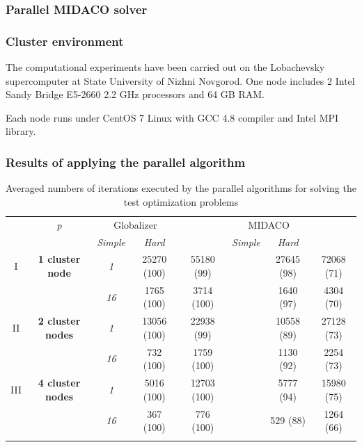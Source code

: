 \documentclass[aspectratio=1610]{beamer}
\begin{document}
\begin{frame}
  \frametitle{Parallel MIDACO solver}
\end{frame}

\begin{frame}
  \frametitle{Cluster environment}
  \begin{center}
  The computational experiments have been carried out on the Lobachevsky supercomputer at  State University of Nizhni Novgorod.
  One node includes 2 Intel Sandy Bridge E5-2660 2.2 GHz processors and 64 GB RAM.

  Each node runs under CentOS 7 Linux with GCC 4.8 compiler and Intel MPI library.
\end{center}
\end{frame}

\begin{frame}
  \frametitle{Results of applying the parallel algorithm}
  \begin{table}
    \centering
    \caption{Averaged numbers of iterations executed by the parallel algorithms for solving the test
  optimization problems}
    \label{tab:iterations}
    \begin{tabular}{cccccccc}
      \cline{3-8}\noalign{\smallskip}
      \multicolumn{2}{c}{  } & \textit{p} & \multicolumn{2}{c}{Globalizer} & &
  \multicolumn{2}{c}{MIDACO}   \\
      \noalign{\smallskip} \cline{4-5} \cline{7-8}  \noalign{\smallskip}
      \multicolumn{2}{c}{  } & & \textit{Simple} & \textit{Hard} & & \textit{Simple} &
  \textit{Hard}  \\
      \noalign{\smallskip}\hline
      I & \textbf{1 cluster node}
        & \textit{1} &   25270 (100)  & 55180 (99) & & 27645 (98) & 72068 (71)  \\
      &  & \textit{16} & 1765 (100)  & 3714 (100) & &  1640 (97) & 4304 (70) \\
      \hline \noalign{\smallskip}
  II  & \textbf{2 cluster nodes}  %
    & \textit{1} & 13056 (100) & 22938 (99) & & 10558 (89) & 27128 (73) \\
  &   & \textit{16} & 732 (100) & 1759 (100)  &  & 1130 (92) & 2254 (73) \\
      \hline \noalign{\smallskip}
  III & \textbf{4 cluster nodes} %
    & \textit{1}  & 5016 (100) & 12703 (100) & & 5777 (94) & 15980 (75) \\
  & & \textit{16} & 367 (100) & 776 (100) & & 529 (88) &  1264 (66) \\
      \hline \noalign{\smallskip}

\end{tabular}
\end{table}
\end{frame}
\end{document}
